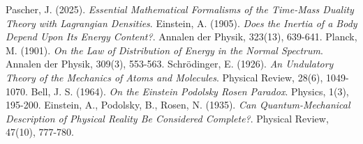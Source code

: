 \documentclass[12pt,a4paper]{article}
\begin{document}
	\begin{thebibliography}{99}
		 Pascher, J. (2025). \textit{Essential Mathematical Formalisms of the Time-Mass Duality Theory with Lagrangian Densities}.
		 Einstein, A. (1905). \textit{Does the Inertia of a Body Depend Upon Its Energy Content?}. Annalen der Physik, 323(13), 639-641.
		 Planck, M. (1901). \textit{On the Law of Distribution of Energy in the Normal Spectrum}. Annalen der Physik, 309(3), 553-563.
		 Schrödinger, E. (1926). \textit{An Undulatory Theory of the Mechanics of Atoms and Molecules}. Physical Review, 28(6), 1049-1070.
		 Bell, J. S. (1964). \textit{On the Einstein Podolsky Rosen Paradox}. Physics, 1(3), 195-200.
		 Einstein, A., Podolsky, B., Rosen, N. (1935). \textit{Can Quantum-Mechanical Description of Physical Reality Be Considered Complete?}. Physical Review, 47(10), 777-780.
	\end{thebibliography}
	
\end{document}
